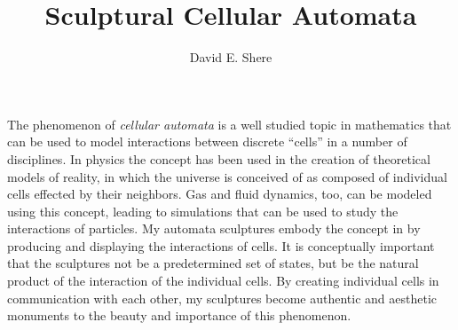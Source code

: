 \documentclass{article}
\title{Sculptural Cellular Automata}
\author{David E. Shere}
\begin{document}
\maketitle

The phenomenon of \textit{cellular automata} is a well studied topic in mathematics that can be used to model interactions between discrete ``cells'' in a number of disciplines.
In physics the concept has been used in the creation of theoretical models of reality, in which the universe is conceived of as composed of individual cells effected by their neighbors.
Gas and fluid dynamics, too, can be modeled using this concept, leading to simulations that can be used to study the interactions of particles.
My automata sculptures embody the concept in by producing and displaying the interactions of cells.
It is conceptually important that the sculptures not be a predetermined set of states, but be the natural product of the interaction of the individual cells.
By creating individual cells in communication with each other, my sculptures become authentic and aesthetic monuments to the beauty and importance of this phenomenon.
\end{document}
